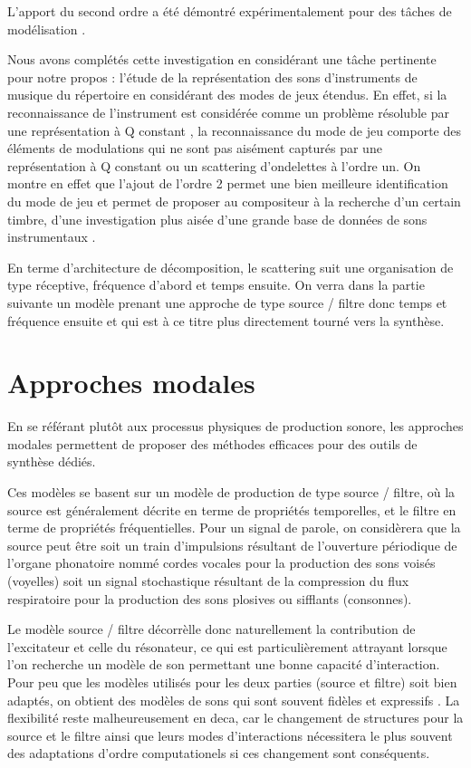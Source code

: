 L'apport du second ordre a été démontré expérimentalement pour des tâches de modélisation \cite{anden2014deep}.

Nous avons complétés cette investigation en considérant une tâche pertinente pour notre propos : l'étude de la représentation des sons d'instruments de musique du répertoire en considérant des modes de jeux étendus. En effet, si la reconnaissance de l'instrument est considérée comme un problème résoluble par une représentation à Q constant \cite{}, la reconnaissance du mode de jeu comporte des éléments de modulations qui ne sont pas aisément capturés par une représentation à Q constant ou un scattering d'ondelettes à l'ordre un. On montre en effet que l'ajout de l'ordre 2 permet une bien meilleure identification du mode de jeu et permet de proposer au compositeur à la recherche d'un certain timbre, d'une investigation plus aisée d'une grande base de données de sons instrumentaux \cite{}.

En terme d'architecture de décomposition, le scattering suit une organisation de type réceptive, fréquence d'abord et temps ensuite. On verra dans la partie suivante un modèle prenant une approche de type source / filtre donc temps et fréquence ensuite et qui est à ce titre plus directement tourné vers la synthèse.

\section{Approches modales}

En se référant plutôt aux processus physiques de production sonore, les approches modales permettent de proposer des méthodes efficaces pour des outils de synthèse dédiés.

Ces modèles se basent sur un modèle de production de type source / filtre, où la source est généralement décrite en terme de propriétés temporelles, et le filtre en terme de propriétés fréquentielles. Pour un signal de parole, on considèrera que la source peut être soit un train d'impulsions résultant de l'ouverture périodique de l'organe phonatoire nommé  cordes vocales pour la production des sons voisés (voyelles) soit un signal stochastique résultant de la compression du flux respiratoire pour la production des sons plosives ou sifflants (consonnes).

Le modèle source / filtre décorrèlle donc naturellement la contribution de l'excitateur et celle du résonateur, ce qui est particulièrement attrayant lorsque l'on recherche un modèle de son permettant une bonne capacité d'interaction. Pour peu que les modèles utilisés pour les deux parties (source et filtre) soit bien adaptés, on obtient des modèles de sons qui sont souvent fidèles et expressifs \cite{modalys, marseille}. La flexibilité reste malheureusement en deca, car le changement de structures pour la source et le filtre ainsi que leurs modes d'interactions nécessitera le plus souvent des adaptations d'ordre computationels si ces changement sont conséquents.

